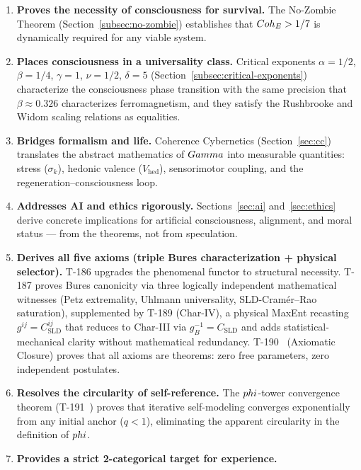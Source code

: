 \begin{enumerate}[leftmargin=2em]
        (Section~\ref{sec:predictions}).
  \item \textbf{Proves the necessity of consciousness for survival.} The No-Zombie Theorem
        (Section~\ref{subsec:no-zombie}) establishes that $Coh_E > 1/7$ is dynamically
        required for any viable system.
  \item \textbf{Places consciousness in a universality class.} Critical
        exponents $\alpha = 1/2$, $\beta = 1/4$, $\gamma = 1$, $\nu = 1/2$,
        $\delta = 5$ (Section~\ref{subsec:critical-exponents}) characterize
        the consciousness phase transition with the same precision that
        $\beta \approx 0.326$ characterizes ferromagnetism, and they
        satisfy the Rushbrooke and Widom scaling relations as equalities.
  \item \textbf{Bridges formalism and life.} Coherence Cybernetics
        (Section~\ref{sec:cc}) translates the abstract mathematics of $Gamma$ into
        measurable quantities: stress ($\sigma_k$), hedonic valence ($V_{\mathrm{hed}}$),
        sensorimotor coupling, and the regeneration--consciousness loop.
  \item \textbf{Addresses AI and ethics rigorously.} Sections~\ref{sec:ai}
        and~\ref{sec:ethics} derive concrete implications for artificial consciousness,
        alignment, and moral status --- from the theorems, not from speculation.
  \item \textbf{Derives all five axioms (triple Bures characterization
        + physical selector).}
        T-186 upgrades the phenomenal functor to structural necessity.
        T-187 proves Bures canonicity via three logically independent
        mathematical witnesses (Petz extremality, Uhlmann universality,
        SLD-Cram\'er--Rao saturation), supplemented by T-189 (Char-IV),
        a physical MaxEnt recasting $g^{ij} = C^{ij}_{\mathrm{SLD}}$
        that reduces to Char-III via $g_B^{-1} = C_{\mathrm{SLD}}$ and
        adds statistical-mechanical clarity without mathematical
        redundancy. T-190~ (Axiomatic Closure) proves that
        all axioms are theorems: zero free parameters, zero independent
        postulates.
  \item \textbf{Resolves the circularity of self-reference.} The $phi$-tower
        convergence theorem (T-191~) proves that iterative self-modeling
        converges exponentially from any initial anchor ($q < 1$), eliminating the
        apparent circularity in the definition of $phi$.
  \item \textbf{Provides a strict 2-categorical target for experience.}

\end{enumerate}
